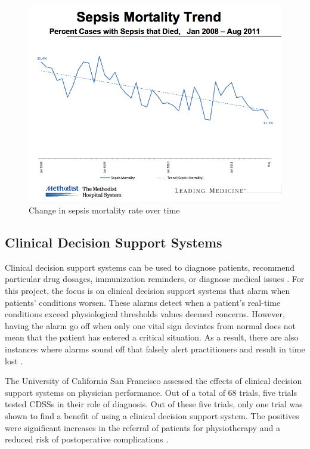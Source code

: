 \documentclass{sig-alternate}
\begin{document}
\begin{figure}
	\begin{center}
		\includegraphics[width=1.0\linewidth]{methodist2.png}
	\end{center}
	\caption{Change in sepsis mortality rate over time}
	\label{fig:mortality_rate_time}
\end{figure}


\vspace{10pt}
\subsection{Clinical Decision Support Systems}
\label{subsec:cdss}
\vspace{10pt}

Clinical decision support systems can be used to diagnose patients, recommend particular drug dosages, immunization reminders, or diagnose medical issues \cite{cdss}. For this project, the focus is on clinical decision support systems that alarm when patients' conditions worsen. These alarms detect when a patient's real-time conditions exceed physiological thresholds values deemed concerns. However, having the alarm go off when only one vital sign deviates from normal does not mean that the patient has entered a critical situation. As a result, there are also instances where alarms sound off that falsely alert practitioners and result in time lost \cite{deaths}.

The University of California San Francisco assessed the effects of clinical decision support systems on physician performance. Out of a total of 68 trials, five trials tested CDSSs in their role of diagnosis. Out of these five trials, only one trial was shown to find a benefit of using a clinical decision support system. The positives were significant increases in the referral of patients for physiotherapy and a reduced risk of postoperative complications \cite{cdss}. 
\end{document}
